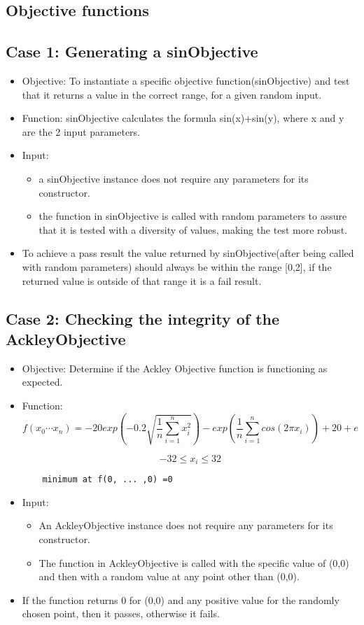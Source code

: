 \documentclass[11pt]{article}
\begin{document}
\subsection{Objective functions}
\subsection{Case 1: Generating a sinObjective}
\begin{itemize}
    \item Objective: To instantiate a specific objective function(sinObjective) and test that it returns a value in the correct range, for a given random input.
    \item Function: sinObjective calculates the formula sin(x)+sin(y), where x and y are the 2 input parameters.
    \item Input:\begin{itemize}
        \item a sinObjective instance does not require any parameters for its constructor.
        \item the function in sinObjective is called with random parameters to assure that it is tested with a diversity of values, making the test more robust.
        \end{itemize}
    \item To achieve a pass result the value returned by sinObjective(after being called with random parameters) should always be within the range [0,2], if the returned value is outside of that range it is a fail result.
\end{itemize}
\subsection{Case 2: Checking the integrity of the AckleyObjective}
\begin{itemize}
	\item Objective: Determine if the Ackley Objective function is functioning as expected.
	\item Function:
	$$f(x_0 \cdots x_n) = -20 exp(-0.2 \sqrt{\frac{1}{n} \sum_{i=1}^n x_i^2}) - exp(\frac{1}{n} \sum_{i=1}^n cos(2\pi x_i)) + 20 + e$$ 
	
	$$-32 \leq x_i \leq 32$$ 
	\begin{center}
	\begin{verbatim}
	minimum at f(0, ... ,0) =0
	\end{verbatim}
	
	\end{center}
	
	
	\item Input: \begin{itemize}
		\item An AckleyObjective instance does not require any parameters for its constructor.
		\item The function in AckleyObjective is called with the specific value of (0,0) and then with a random value at any point other than (0,0).
	\end{itemize}
	\item If the function returns 0 for (0,0) and any positive value for the randomly chosen point, then it passes, otherwise it fails.
\end{itemize}
\end{document}
